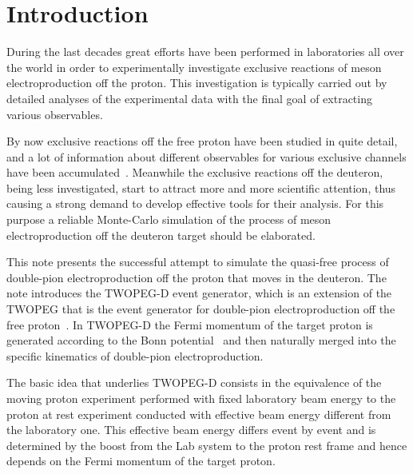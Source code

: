 

\newpage
\chapter{Introduction}
\mbox{}\vspace{-\baselineskip}





 
During the last decades great efforts have been performed in laboratories all over the world in order to experimentally investigate exclusive reactions of meson electroproduction off the proton. This investigation is typically carried out by detailed analyses of the experimental data with the final goal of extracting various observables. 

By now exclusive reactions off the free proton have been studied in quite detail, and a lot of information about different observables for various exclusive channels have been accumulated~\cite{CLAS_DB}. Meanwhile the exclusive reactions off the deuteron, being less investigated,  start to attract more and more scientific attention, thus causing a strong demand to develop effective tools for their analysis. For this purpose a reliable Monte-Carlo simulation of the process of meson electroproduction off the deuteron target should be elaborated.

This note presents the successful attempt to simulate the quasi-free process of double-pion electroproduction off the proton that moves in the deuteron. The note introduces the TWOPEG-D event generator, which is an extension of the TWOPEG that is the event generator for double-pion electroproduction off the free proton~\cite{twopeg}. In TWOPEG-D the Fermi momentum of the target proton is generated according to the Bonn potential~\cite{Machleidt:1987hj} and then naturally merged into the specific kinematics of double-pion electroproduction.

The basic idea that underlies TWOPEG-D consists in the equivalence of the moving proton experiment performed with fixed laboratory beam energy to the proton at rest experiment conducted  with effective beam energy different from the laboratory one. This effective beam energy differs event by event and is determined by the boost from the Lab system to the proton rest frame and hence depends on the Fermi momentum of the target proton. 






